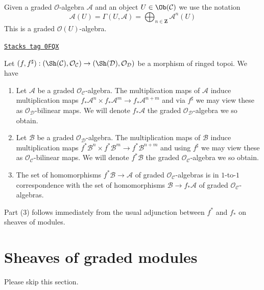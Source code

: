 Given a graded $\mathcal{O}$-algebra $\mathcal{A}$
and an object $U \in \Ob(\mathcal{C})$ we use the notation
$$
\mathcal{A}(U) =
\Gamma(U, \mathcal{A}) =
\bigoplus\nolimits_{n \in \mathbf{Z}} \mathcal{A}^n(U)
$$
This is a graded $\mathcal{O}(U)$-algebra.

\begin{remark}[Functoriality ga]
\label{sdga-remark-functoriality-ga}
\href{https://stacks.math.columbia.edu/tag/0FQX}{\texttt{Stacks tag 0FQX}}

Let $(f, f^\sharp) : (\Sh(\mathcal{C}), \mathcal{O}_\mathcal{C})
\to (\Sh(\mathcal{D}), \mathcal{O}_\mathcal{D})$
be a morphism of ringed topoi. We have
\begin{enumerate}
\item Let $\mathcal{A}$ be a graded $\mathcal{O}_\mathcal{C}$-algebra.
The multiplication maps of $\mathcal{A}$ induce multiplication maps
$f_*\mathcal{A}^n \times f_*\mathcal{A}^m \to f_*\mathcal{A}^{n + m}$
and via $f^\sharp$ we may view these as $\mathcal{O}_\mathcal{D}$-bilinear
maps. We will denote $f_*\mathcal{A}$ the graded
$\mathcal{O}_\mathcal{D}$-algebra we so obtain.
\item Let $\mathcal{B}$ be a graded
$\mathcal{O}_\mathcal{D}$-algebra.
The multiplication maps of $\mathcal{B}$ induce multiplication maps
$f^*\mathcal{B}^n \times f^*\mathcal{B}^m \to f^*\mathcal{B}^{n + m}$
and using $f^\sharp$ we may view these as $\mathcal{O}_\mathcal{C}$-bilinear
maps. We will denote $f^*\mathcal{B}$
the graded $\mathcal{O}_\mathcal{C}$-algebra we so obtain.
\item The set of homomorphisms $f^*\mathcal{B} \to \mathcal{A}$
of graded $\mathcal{O}_\mathcal{C}$-algebras is in
$1$-to-$1$ correspondence with the set of homomorphisms
$\mathcal{B} \to f_*\mathcal{A}$ of graded $\mathcal{O}_\mathcal{C}$-algebras.
\end{enumerate}
Part (3) follows immediately from the usual adjunction between $f^*$ and $f_*$
on sheaves of modules.
\end{remark}

\section{Sheaves of graded modules}
\label{sdga-section-graded-modules}
Please skip this section.

